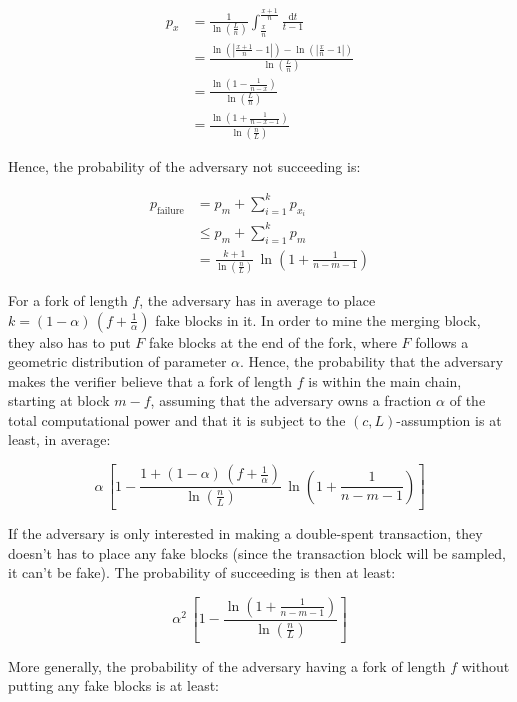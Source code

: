         \begin{align*}
          p_x &= \frac{1}{\ln\left(\frac{L}{n}\right)}\int_{\frac{x}{n}}^{\frac{x+1}{n}}\frac{\mathrm{d}t}{t-1}\\
          &= \frac{\ln\left(\left|\frac{x+1}{n}-1\right|\right)-\ln\left(\left|\frac{x}{n}-1\right|\right)}{\ln\left(\frac{L}{n}\right)}\\
          &= \frac{\ln\left(1-\frac{1}{n-x}\right)}{\ln\left(\frac{L}{n}\right)}\\
          &= \frac{\ln\left(1+\frac{1}{n-x-1}\right)}{\ln\left(\frac{n}{L}\right)}
        \end{align*}
        
        Hence, the probability of the adversary not succeeding is:
        
        \begin{align*}
          p_{\text{failure}} &= p_m + \sum_{i=1}^kp_{x_i}\\
          &\leqslant p_m + \sum_{i=1}^kp_m\\
          &= \frac{k+1}{\ln\left(\frac{n}{L}\right)}\,\ln\left(1+\frac{1}{n-m-1}\right)
        \end{align*}
        
        For a fork of length \(f\), the adversary has in average to place \(k=(1-\alpha)\,\left(f+\frac{1}{\alpha}\right)\) fake blocks in it. In order to mine the merging block, they also has to put \(F\) fake blocks at the end of the fork, where \(F\) follows a geometric distribution of parameter \(\alpha\). Hence, the probability that the adversary makes the verifier believe that a fork of length \(f\) is within the main chain, starting at block \(m-f\), assuming that the adversary owns a fraction \(\alpha\) of the total computational power and that it is subject to the \((c,L)\)-assumption is at least, in average:
        
        \[\alpha\,\left[1-\frac{1+(1-\alpha)\,\left(f+\frac1\alpha\right)}{\ln\left(\frac{n}{L}\right)}\,\ln\left(1+\frac{1}{n-m-1}\right)\right]\]
        
        If the adversary is only interested in making a double-spent transaction, they doesn't has to place any fake blocks (since the transaction block will be sampled, it can't be fake). The probability of succeeding is then at least:
        
        \[\alpha^2\,\left[1-\frac{\ln\left(1+\frac{1}{n-m-1}\right)}{\ln\left(\frac{n}{L}\right)}\right]\]
        
        More generally, the probability of the adversary having a fork of length \(f\) without putting any fake blocks is at least:
        
